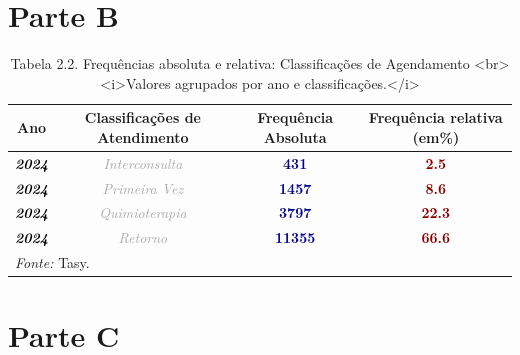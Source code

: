 \documentclass[
  letterpaper,
  DIV=11,
  numbers=noendperiod]{scrreprt}
\begin{document}
\section{Parte B}

\begin{table}
\centering
\caption{Tabela 2.2. Frequências absoluta e relativa: Classificações de Agendamento  <br><i>Valores agrupados por ano e classificações.</i>}
\centering
\begin{tabular}[t]{>{}c|>{}c|>{}c|>{}c}
\hline
Ano & Classificações de Atendimento & Frequência Absoluta & Frequência relativa (em\%)\\
\hline
\textcolor{black}{\em{\textbf{2024}}} & \textcolor{darkgray}{\em{Interconsulta}} & \textcolor{darkblue}{\textbf{431}} & \textcolor{darkred}{\textbf{2.5}}\\
\hline
\textcolor{black}{\em{\textbf{2024}}} & \textcolor{darkgray}{\em{Primeira Vez}} & \textcolor{darkblue}{\textbf{1457}} & \textcolor{darkred}{\textbf{8.6}}\\
\hline
\textcolor{black}{\em{\textbf{2024}}} & \textcolor{darkgray}{\em{Quimioterapia}} & \textcolor{darkblue}{\textbf{3797}} & \textcolor{darkred}{\textbf{22.3}}\\
\hline
\textcolor{black}{\em{\textbf{2024}}} & \textcolor{darkgray}{\em{Retorno}} & \textcolor{darkblue}{\textbf{11355}} & \textcolor{darkred}{\textbf{66.6}}\\
\hline
\multicolumn{4}{l}{\rule{0pt}{1em}\textit{Fonte: } Tasy.}\\
\end{tabular}
\end{table}

\section{Parte C}
\end{document}
